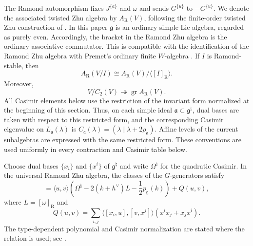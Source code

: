 \documentclass[11pt,reqno]{amsart}
\theoremstyle{definition}
\theoremstyle{remark}
\begin{document}
The Ramond automorphism fixes $J^{\{a\}}$ and $\omega$ and sends
$G^{\{u\}}$ to $-G^{\{u\}}$.  We denote the associated twisted Zhu algebra
by $A_{\mathrm R}(V)$, following the finite-order twisted Zhu construction
of \cite{DongLiMason1998}.  In this paper $\mathfrak g$ is an ordinary simple
Lie algebra, regarded as purely even.  Accordingly, the bracket in the
Ramond Zhu algebra is the ordinary associative commutator.  This is
compatible with the identification of the Ramond Zhu algebra with Premet's
ordinary finite $W$-algebra
\cite[Equation~(5.1) and Remark~5.8]{KacMosenederFrajriaPapi2025}.  If $I$ is Ramond-stable, then
\[
 A_{\mathrm R}(V/I)\cong A_{\mathrm R}(V)/\langle[I]_{\mathrm R}\rangle.
\]
Moreover,
\begin{equation}
 V/C_2(V)\twoheadrightarrow\operatorname{gr}A_{\mathrm R}(V).
 \label{eq:common-C2-Ramond-Zhu}
\end{equation}
All Casimir elements below use the restriction of the invariant form
normalized at the beginning of this section.  Thus, on each simple ideal
$\mathfrak a\subset\mathfrak g^\natural$, dual bases are taken with
respect to this restricted form, and the corresponding Casimir eigenvalue
on $L_{\mathfrak a}(\lambda)$ is
$C_{\mathfrak a}(\lambda)=(\lambda\mid\lambda+2\rho_{\mathfrak a})$.
Affine levels of the current subalgebras are expressed with the same
restricted form.  These conventions are used uniformly in every
contraction and Casimir table below.

Choose dual bases $\{x_i\}$ and $\{x^i\}$ of $\mathfrak g^\natural$ and
write $\Omega^\natural$ for the quadratic Casimir.  In the universal
Ramond Zhu algebra, the classes of the $G$-generators satisfy
\begin{equation}
 [u,v]=\langle u,v\rangle
 \left(\Omega^\natural-2(k+h^\vee)L-\frac12p_{\mathfrak g}(k)\right)
 +Q(u,v),
 \label{eq:common-Ramond-Zhu}
\end{equation}
where $L=[\omega]_{\mathrm R}$ and
\begin{equation}
 Q(u,v)=\sum_{i,j}\langle[x_i,u],[v,x^j]\rangle
       (x^ix_j+x_jx^i).
 \label{eq:common-quadratic-term}
\end{equation}
The type-dependent polynomial and Casimir normalization are stated where the
relation is used; see \cite{AdamovicKacMosenederFrajriaPapiPerse2018,
KacMosenederFrajriaPapi2025}.
\end{document}
